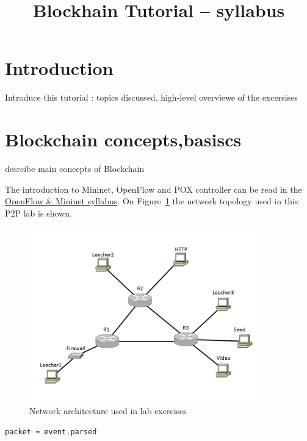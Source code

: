 \documentclass[a4paper]{article}
\title{Blockhain Tutorial – syllabus}
\author{}
\date{}
\begin{document}
\maketitle

\tableofcontents

\section{Introduction}

Introduce this tutorial : topics discussed, high-level overviewe of the excersises

\section{Blockchain concepts,basiscs}

desrcibe main concepts of Blockchain 

The introduction to Mininet, OpenFlow and POX controller can be read in the
\href{https://qosip.tmit.bme.hu/foswiki/pub/Meres/OpenFlowMSc/OpenFlow-Mininet-syllabus-en.pdf}{OpenFlow \& Mininet
    syllabus}. On
Figure~\ref{fig:Lab-topo} the network topology used in this P2P lab is shown.

\begin{figure}[H]
    \centering
    \includegraphics[width=0.9\textwidth]{figures/halozat.png}
    \caption{Network architecture used in lab exercises}
    \label{fig:Lab-topo}
\end{figure}

\begin{lstlisting}[language=python,frame=single,breaklines]
packet = event.parsed  
\end{lstlisting}
\end{document}

